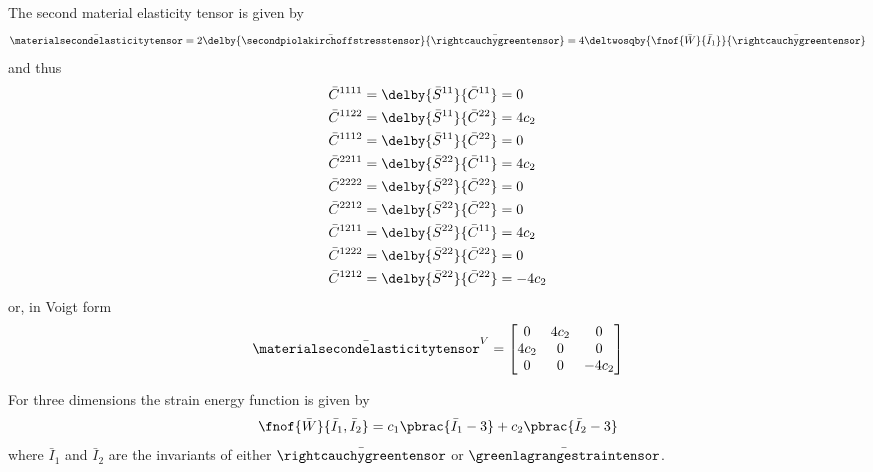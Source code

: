 The second material elasticity tensor is given by
\begin{equation}
  \bar{\materialsecondelasticitytensor}=2\delby{\bar{\secondpiolakirchoffstresstensor}}{\bar{\rightcauchygreentensor}}=4\deltwosqby{\fnof{\bar{W}}{\bar{I}_{1}}}{\bar{\rightcauchygreentensor}}\\
\end{equation}
and thus
\begin{equation}
  \begin{split}
    \bar{C}^{1111}&=\delby{\bar{S}^{11}}{\bar{C}^{11}}=0\\
    \bar{C}^{1122}&=\delby{\bar{S}^{11}}{\bar{C}^{22}}=4c_{2}\\
    \bar{C}^{1112}&=\delby{\bar{S}^{11}}{\bar{C}^{22}}=0\\
    \bar{C}^{2211}&=\delby{\bar{S}^{22}}{\bar{C}^{11}}=4c_{2}\\
    \bar{C}^{2222}&=\delby{\bar{S}^{22}}{\bar{C}^{22}}=0\\
    \bar{C}^{2212}&=\delby{\bar{S}^{22}}{\bar{C}^{22}}=0\\
    \bar{C}^{1211}&=\delby{\bar{S}^{22}}{\bar{C}^{11}}=4c_{2}\\
    \bar{C}^{1222}&=\delby{\bar{S}^{22}}{\bar{C}^{22}}=0\\
    \bar{C}^{1212}&=\delby{\bar{S}^{22}}{\bar{C}^{22}}=-4c_{2}\\
  \end{split}
\end{equation}
or, in Voigt form
\begin{equation}
  \bar{\materialsecondelasticitytensor}^{V}=\begin{bmatrix}
  0 & 4c_{2} & 0 \\
  4c_{2} & 0 & 0 \\
  0 & 0 & -4c_{2}
  \end{bmatrix}
\end{equation}

For three dimensions the strain energy function is given by
\begin{equation}
  \fnof{\bar{W}}{\bar{I}_{1},\bar{I}_{2}}=c_{1}\pbrac{\bar{I}_{1}-3}+c_{2}\pbrac{\bar{I}_{2}-3}
\end{equation}
where $\bar{I}_{1}$ and $\bar{I}_{2}$ are the invariants of either $\bar{\rightcauchygreentensor}$ or $\bar{\greenlagrangestraintensor}$.

